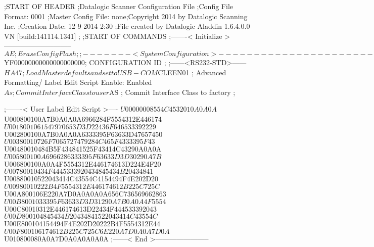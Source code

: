 ;START OF HEADER
;Datalogic Scanner Configuration File
;Config File Format: 0001
;Master Config File: none;Copyright 2014 by Datalogic Scanning Inc.
;Creation Date: 12 9 2014 2:30
;File created by Datalogic Aladdin 1.6.4.0.0 VN [build:141114.1341]
;
;START OF COMMANDS
;-------< Initialize >-----------------------------
$AE                 ; Erase Config Flash
;
;-------< System Configuration >-------------------------------
$YF00000000000000000000; CONFIGURATION ID
;
;------<RS232-STD>------
$HA47               ; Load Master defaults and set to USB-COM
$CLEEN01            ; Advanced Formatting/ Label Edit Script Enable: Enabled
$As                 ; Commit Interface Class to user
$AS                 ; Commit Interface Class to factory
;

;-------< User Label Edit Script >----
$U00000008554C4532010A0A0A
$U000800100A7B0A0A0A6966284F5554312E446174
$U0018001061547970653D3D22436F646533392229
$U002800100A7B0A0A0A6333395F63633D47657450
$U00380010726F7065727479284C465F4333395F43
$U00480010484B5F434841525F43414C43290A0A0A
$U005800100A6966286333395F63633D3D30290A7B
$U006800100A0A4F5554312E446174613D224E4F20
$U00780010434F4445333920434845434B20434841
$U00880010522043414C43554C4154494F4E202D20
$U00980010222B4F5554312E446174612B225C725C
$U00A800106E220A7D0A0A0A0A656C736569662863
$U00B8001033395F63633D3D31290A7B0A0A4F5554
$U00C80010312E446174613D22434F444533392043
$U00D800104845434B20434841522043414C43554C
$U00E800104154494F4E202D20222B4F5554312E44
$U00F800106174612B225C725C6E220A7D0A0A7D0A
$U010800080A0A7D0A0A0A0A0A
;------< End >-----------------------
